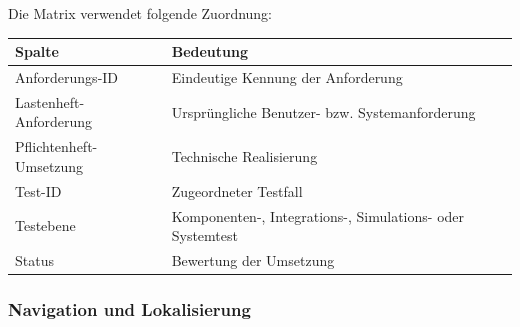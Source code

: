 Die Matrix verwendet folgende Zuordnung:

\begin{longtable}[]{@{}
  >{\raggedright\arraybackslash}p{}
  >{\raggedright\arraybackslash}p{}@{}}
\toprule\noalign{}
\begin{minipage}[b]{\linewidth}\raggedright
Spalte
\end{minipage} & \begin{minipage}[b]{\linewidth}\raggedright
Bedeutung
\end{minipage} \\
\midrule\noalign{}
\endhead
\bottomrule\noalign{}
\endlastfoot
Anforderungs-ID & Eindeutige Kennung der Anforderung \\
Lastenheft-Anforderung & Ursprüngliche Benutzer- bzw.
Systemanforderung \\
Pflichtenheft-Umsetzung & Technische Realisierung \\
Test-ID & Zugeordneter Testfall \\
Testebene & Komponenten-, Integrations-, Simulations- oder Systemtest \\
Status & Bewertung der Umsetzung \\
\end{longtable}

\subsubsection{Navigation und
Lokalisierung}\label{navigation-und-lokalisierung-1}

